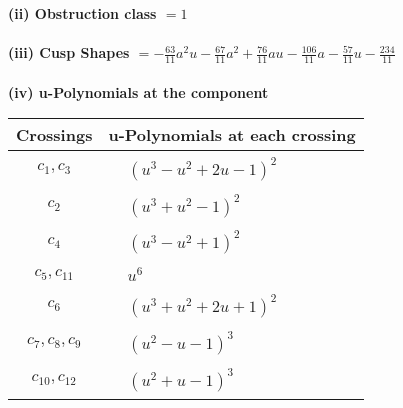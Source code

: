 \documentclass[1p]{elsarticle_modified}
\theoremstyle{definition}
\begin{document}
\flushleft \textbf{(ii) Obstruction class $= 1$}\\~\\
\flushleft \textbf{(iii) Cusp Shapes $= -\frac{63}{11} a^2 u-\frac{67}{11} a^2+\frac{76}{11} a u-\frac{106}{11} a-\frac{57}{11} u-\frac{234}{11}$}\\~\\
\newpage\renewcommand{\arraystretch}{1}
\flushleft \textbf{(iv) u-Polynomials at the component}\newline \\
\begin{tabular}{m{50pt}|m{274pt}}
Crossings & \hspace{64pt}u-Polynomials at each crossing \\
\hline $$\begin{aligned}c_{1},c_{3}\end{aligned}$$&$\begin{aligned}
&(u^3- u^2+2 u-1)^2
\end{aligned}$\\
\hline $$\begin{aligned}c_{2}\end{aligned}$$&$\begin{aligned}
&(u^3+u^2-1)^2
\end{aligned}$\\
\hline $$\begin{aligned}c_{4}\end{aligned}$$&$\begin{aligned}
&(u^3- u^2+1)^2
\end{aligned}$\\
\hline $$\begin{aligned}c_{5},c_{11}\end{aligned}$$&$\begin{aligned}
&u^6
\end{aligned}$\\
\hline $$\begin{aligned}c_{6}\end{aligned}$$&$\begin{aligned}
&(u^3+u^2+2 u+1)^2
\end{aligned}$\\
\hline $$\begin{aligned}c_{7},c_{8},c_{9}\end{aligned}$$&$\begin{aligned}
&(u^2- u-1)^3
\end{aligned}$\\
\hline $$\begin{aligned}c_{10},c_{12}\end{aligned}$$&$\begin{aligned}
&(u^2+u-1)^3
\end{aligned}$\\
\hline
\end{tabular}\\~\\
\end{document}
